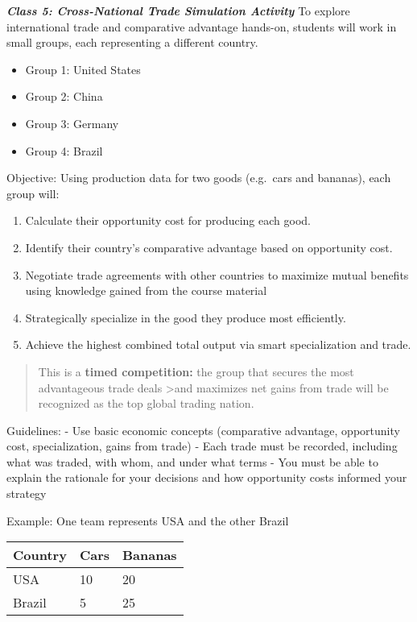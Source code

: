 \documentclass[
  11pt,
]{article}
\providecommand{\tightlist}{%
  \setlength{\itemsep}{0pt}\setlength{\parskip}{0pt}}
\begin{document}
\textbf{\emph{Class 5: Cross-National Trade Simulation Activity}} To
explore international trade and comparative advantage hands-on, students
will work in small groups, each representing a different country.

\begin{itemize}
\tightlist
\item
  Group 1: United States\\
\item
  Group 2: China\\
\item
  Group 3: Germany\\
\item
  Group 4: Brazil
\end{itemize}

Objective: Using production data for two goods (e.g.~cars and bananas),
each group will:

\begin{enumerate}
\def\labelenumi{\arabic{enumi}.}
\tightlist
\item
  Calculate their opportunity cost for producing each good.
\item
  Identify their country's comparative advantage based on opportunity
  cost.
\item
  Negotiate trade agreements with other countries to maximize mutual
  benefits using knowledge gained from the course material
\item
  Strategically specialize in the good they produce most efficiently.
\item
  Achieve the highest combined total output via smart specialization and
  trade.
\end{enumerate}

\begin{quote}
This is a \textbf{timed competition:} the group that secures the most
advantageous trade deals \textgreater and maximizes net gains from trade
will be recognized as the top global trading nation.
\end{quote}

Guidelines: - Use basic economic concepts (comparative advantage,
opportunity cost, specialization, gains from trade) - Each trade must be
recorded, including what was traded, with whom, and under what terms -
You must be able to explain the rationale for your decisions and how
opportunity costs informed your strategy

Example: One team represents USA and the other Brazil

\begin{longtable}[]{@{}lll@{}}
\toprule\noalign{}
Country & Cars & Bananas \\
\midrule\noalign{}
\endhead
\bottomrule\noalign{}
\endlastfoot
USA & 10 & 20 \\
Brazil & 5 & 25 \\
\end{longtable}
\end{document}
